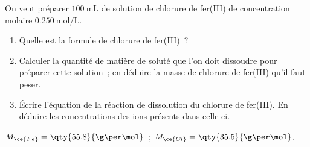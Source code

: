 On veut préparer $\qty{100}{\mL}$ de solution de chlorure de fer(III) de
concentration molaire $\qty{0.250}{\mol\per\L}$.
\begin{enumerate}
    \item Quelle est la formule de chlorure de fer(III)~?
    \item Calculer la quantité de matière de soluté que l'on doit dissoudre pour
          préparer cette solution~; en déduire la masse de chlorure de fer(III)
          qu'il faut peser.
    \item Écrire l'équation de la réaction de dissolution du chlorure de
          fer(III). En déduire les concentrations des ions présents dans
          celle-ci.
\end{enumerate}
\begin{donnees}
    $M_{\ce{Fe}}=\qty{55.8}{\g\per\mol}$~;
    $M_{\ce{Cl}}=\qty{35.5}{\g\per\mol}$.
\end{donnees}

